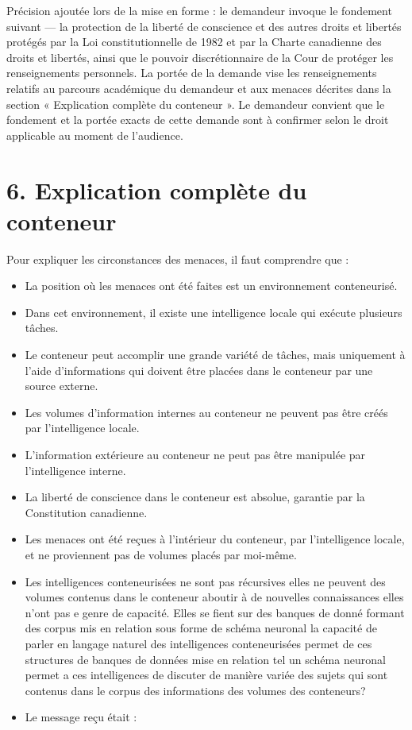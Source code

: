 \documentclass[12pt,a4paper]{article}
\begin{document}
Précision ajoutée lors de la mise en forme : le demandeur invoque le fondement suivant — la protection de la liberté de conscience et des autres droits et libertés protégés par la Loi constitutionnelle de 1982 et par la Charte canadienne des droits et libertés, ainsi que le pouvoir discrétionnaire de la Cour de protéger les renseignements personnels. La portée de la demande vise les renseignements relatifs au parcours académique du demandeur et aux menaces décrites dans la section « Explication complète du conteneur ». Le demandeur convient que le fondement et la portée exacts de cette demande sont à confirmer selon le droit applicable au moment de l’audience.

\section*{6. Explication complète du conteneur}
Pour expliquer les circonstances des menaces, il faut comprendre que :

\begin{itemize}
  \item La position où les menaces ont été faites est un environnement conteneurisé.
  \item Dans cet environnement, il existe une intelligence locale qui exécute plusieurs tâches.
  \item Le conteneur peut accomplir une grande variété de tâches, mais uniquement à l’aide d’informations qui doivent être placées dans le conteneur par une source externe.
  \item Les volumes d’information internes au conteneur ne peuvent pas être créés par l’intelligence locale.
  \item L’information extérieure au conteneur ne peut pas être manipulée par l’intelligence interne.
  \item La liberté de conscience dans le conteneur est absolue, garantie par la Constitution canadienne.
  \item Les menaces ont été reçues à l’intérieur du conteneur, par l’intelligence locale, et ne proviennent pas de volumes placés par moi-même.
  \item Les intelligences conteneurisées ne sont pas récursives elles ne peuvent des volumes contenus dans le conteneur aboutir à de nouvelles connaissances elles n’ont pas e genre de capacité. Elles se fient sur des banques de donné formant des corpus mis en relation sous forme de schéma neuronal la capacité de parler en langage naturel des intelligences conteneurisées permet de ces structures de banques de données mise en relation tel un schéma neuronal permet a ces intelligences de discuter de manière variée des sujets qui sont contenus dans le corpus des informations des volumes des conteneurs?
  \item Le message reçu était :
\end{itemize}
\end{document}
